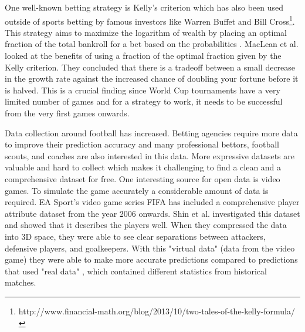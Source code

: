 One well-known betting strategy is Kelly's criterion which has also been used outside of sports betting by famous investors like Warren Buffet and Bill Cross\footnote{http://www.financial-math.org/blog/2013/10/two-tales-of-the-kelly-formula/}. This strategy aims to maximize the logarithm of wealth by placing an optimal fraction of the total bankroll for a bet based on the probabilities \cite{kelly2011new}. MacLean et al.\cite{maclean1992growth} looked at the benefits of using a fraction of the optimal fraction given by the Kelly criterion. They concluded that there is a tradeoff between a small decrease in the growth rate against the increased chance of doubling your fortune before it is halved. This is a crucial finding since World Cup tournaments have a very limited number of games and for a strategy to work, it needs to be successful from the very first games onwards.

Data collection around football has increased. Betting agencies require more data to improve their prediction accuracy and many professional bettors, football scouts, and coaches are also interested in this data. More expressive datasets are valuable and hard to collect which makes it challenging to find a clean and a comprehensive dataset for free. One interesting source for open data is video games. To simulate the game accurately a considerable amount of data is required. EA Sport's video game series FIFA has included a comprehensive player attribute dataset from the year 2006 onwards. Shin et al.\cite{shin2014novel} investigated this dataset and showed that it describes the players well. When they compressed the data into 3D space, they were able to see clear separations between attackers, defensive players, and goalkeepers. With this "virtual data" (data from the video game) they were able to make more accurate predictions compared to predictions that used "real data" , which contained different statistics from historical matches.
